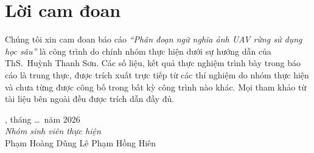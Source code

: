 \chapter*{Lời cam đoan}

Chúng tôi xin cam đoan báo cáo \textit{``Phân đoạn ngữ nghĩa ảnh UAV rừng sử dụng học
sâu''} là công trình do chính nhóm thực hiện dưới sự hướng dẫn của
ThS.~Huỳnh Thanh Sơn. Các số liệu, kết quả thực nghiệm trình bày trong báo cáo là
trung thực, được trích xuất trực tiếp từ các thí nghiệm do nhóm thực hiện và chưa
từng được công bố trong bất kỳ công trình nào khác. Mọi tham khảo từ tài liệu bên
ngoài đều được trích dẫn đầy đủ.

\vspace{1.5cm}
\begin{flushright}
, tháng \dots\ năm 2026\\[0.3cm]
\textit{Nhóm sinh viên thực hiện}\\[1.5cm]
Phạm Hoàng Dũng \qquad\qquad Lê Phạm Hồng Hiên
\end{flushright}
